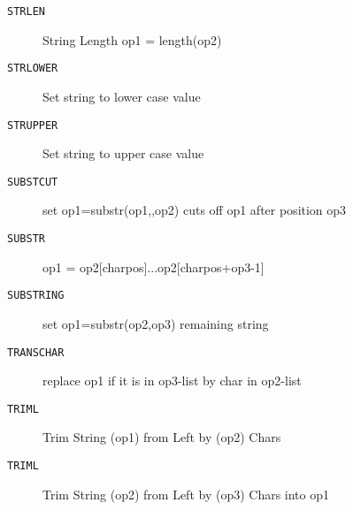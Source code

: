 
\begin{description}
\item[\texttt{STRLEN     }]  String Length op1 = length(op2)\\
\end{description}

\begin{description}
\item[\texttt{STRLOWER   }]  Set string to lower case value\\
\end{description}

\begin{description}
\item[\texttt{STRUPPER   }]  Set string to upper case value\\
\end{description}

\begin{description}
\item[\texttt{SUBSTCUT   }]  set op1=substr(op1,,op2) cuts off op1 after position op3\\
\end{description}

\begin{description}
\item[\texttt{SUBSTR     }]  op1 = op2[charpos]...op2[charpos+op3-1]\\
\end{description}

\begin{description}
\item[\texttt{SUBSTRING  }]  set op1=substr(op2,op3) remaining string\\
\end{description}

\begin{description}
\item[\texttt{TRANSCHAR  }]  replace op1 if it is in op3-list by char in op2-list\\
\end{description}

\begin{description}
\item[\texttt{TRIML      }]  Trim String (op1) from Left by (op2) Chars\\
\end{description}

\begin{description}
\item[\texttt{TRIML      }]  Trim String (op2) from Left by (op3) Chars into op1\\
\end{description}
